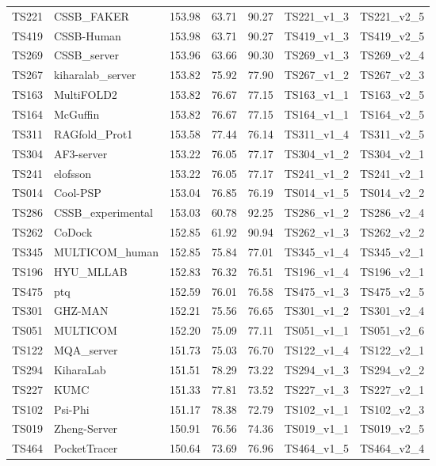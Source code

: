 \begin{longtable}{lllllll}
TS221 & CSSB\_FAKER & 153.98 & 63.71 & 90.27 & TS221\_v1\_3 & TS221\_v2\_5 \\ 
TS419 & CSSB-Human & 153.98 & 63.71 & 90.27 & TS419\_v1\_3 & TS419\_v2\_5 \\ 
TS269 & CSSB\_server & 153.96 & 63.66 & 90.30 & TS269\_v1\_3 & TS269\_v2\_4 \\ 
TS267 & kiharalab\_server & 153.82 & 75.92 & 77.90 & TS267\_v1\_2 & TS267\_v2\_3 \\ 
TS163 & MultiFOLD2 & 153.82 & 76.67 & 77.15 & TS163\_v1\_1 & TS163\_v2\_5 \\ 
TS164 & McGuffin & 153.82 & 76.67 & 77.15 & TS164\_v1\_1 & TS164\_v2\_5 \\ 
TS311 & RAGfold\_Prot1 & 153.58 & 77.44 & 76.14 & TS311\_v1\_4 & TS311\_v2\_5 \\ 
TS304 & AF3-server & 153.22 & 76.05 & 77.17 & TS304\_v1\_2 & TS304\_v2\_1 \\ 
TS241 & elofsson & 153.22 & 76.05 & 77.17 & TS241\_v1\_2 & TS241\_v2\_1 \\ 
TS014 & Cool-PSP & 153.04 & 76.85 & 76.19 & TS014\_v1\_5 & TS014\_v2\_2 \\ 
TS286 & CSSB\_experimental & 153.03 & 60.78 & 92.25 & TS286\_v1\_2 & TS286\_v2\_4 \\ 
TS262 & CoDock & 152.85 & 61.92 & 90.94 & TS262\_v1\_3 & TS262\_v2\_2 \\ 
TS345 & MULTICOM\_human & 152.85 & 75.84 & 77.01 & TS345\_v1\_4 & TS345\_v2\_1 \\ 
TS196 & HYU\_MLLAB & 152.83 & 76.32 & 76.51 & TS196\_v1\_4 & TS196\_v2\_1 \\ 
TS475 & ptq & 152.59 & 76.01 & 76.58 & TS475\_v1\_3 & TS475\_v2\_5 \\ 
TS301 & GHZ-MAN & 152.21 & 75.56 & 76.65 & TS301\_v1\_2 & TS301\_v2\_4 \\ 
TS051 & MULTICOM & 152.20 & 75.09 & 77.11 & TS051\_v1\_1 & TS051\_v2\_6 \\ 
TS122 & MQA\_server & 151.73 & 75.03 & 76.70 & TS122\_v1\_4 & TS122\_v2\_1 \\ 
TS294 & KiharaLab & 151.51 & 78.29 & 73.22 & TS294\_v1\_3 & TS294\_v2\_2 \\ 
TS227 & KUMC & 151.33 & 77.81 & 73.52 & TS227\_v1\_3 & TS227\_v2\_1 \\ 
TS102 & Psi-Phi & 151.17 & 78.38 & 72.79 & TS102\_v1\_1 & TS102\_v2\_3 \\ 
TS019 & Zheng-Server & 150.91 & 76.56 & 74.36 & TS019\_v1\_1 & TS019\_v2\_5 \\ 
TS464 & PocketTracer & 150.64 & 73.69 & 76.96 & TS464\_v1\_5 & TS464\_v2\_4 \\ 

\end{longtable}
